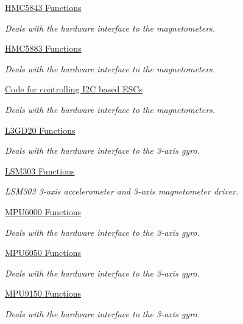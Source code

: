 \begin{DoxyCompactItemize}
\hyperlink{group___p_i_o_s___h_m_c5843}{\-H\-M\-C5843 Functions}
\begin{DoxyCompactList}\small\item\em \-Deals with the hardware interface to the magnetometers. \end{DoxyCompactList}\item 
\hyperlink{group___p_i_o_s___h_m_c5883}{\-H\-M\-C5883 Functions}
\begin{DoxyCompactList}\small\item\em \-Deals with the hardware interface to the magnetometers. \end{DoxyCompactList}\item 
\hyperlink{group___p_i_o_s___i2_c___e_s_c}{\-Code for controlling I2\-C based E\-S\-Cs}
\begin{DoxyCompactList}\small\item\em \-Deals with the hardware interface to the magnetometers. \end{DoxyCompactList}\item 
\hyperlink{group___p_i_o_s___l3_g_d20}{\-L3\-G\-D20 Functions}
\begin{DoxyCompactList}\small\item\em \-Deals with the hardware interface to the 3-\/axis gyro. \end{DoxyCompactList}\item 
\hyperlink{group___p_i_o_s___l_s_m303}{\-L\-S\-M303 Functions}
\begin{DoxyCompactList}\small\item\em \-L\-S\-M303 3-\/axis accelerometer and 3-\/axis magnetometer driver. \end{DoxyCompactList}\item 
\hyperlink{group___p_i_o_s___m_p_u6000}{\-M\-P\-U6000 Functions}
\begin{DoxyCompactList}\small\item\em \-Deals with the hardware interface to the 3-\/axis gyro. \end{DoxyCompactList}\item 
\hyperlink{group___p_i_o_s___m_p_u6050}{\-M\-P\-U6050 Functions}
\begin{DoxyCompactList}\small\item\em \-Deals with the hardware interface to the 3-\/axis gyro. \end{DoxyCompactList}\item 
\hyperlink{group___p_i_o_s___m_p_u9150}{\-M\-P\-U9150 Functions}
\begin{DoxyCompactList}\small\item\em \-Deals with the hardware interface to the 3-\/axis gyro. \end{DoxyCompactList}\item 

\end{DoxyCompactItemize}
